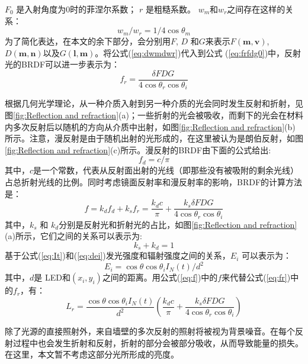   $F_{0}$ 是入射角度为0时的菲涅尔系数； $r$ 是粗糙系数。
$w_{m}$和$w_{r}$之间存在这样的关系：
\begin{equation}\label{eq:dwmdwr}
w_{m}/w_{r}=1/4\cos\theta_{m}
\end{equation}
为了简化表达，在本文的余下部分，会分别用$F$, $D$ 和$G$来表示$F(\mathbf{m},\mathbf{v})$, $D(\mathbf{m},\mathbf{n})$以及$G(\mathbf{l},\mathbf{m})$。将公式(\ref{eq:dwmdwr})代入到公式 (\ref{eq:frfdg0})中，反射光的BRDF可以进一步表示为：
\begin{equation}\label{eq:frfdg1}
  f_{r}=\frac{\delta FDG}{4\cos\theta_{r}\cos\theta_{i}}
\end{equation}

根据几何光学理论，从一种介质入射到另一种介质的光会同时发生反射和折射，见图\ref{fig:Reflection and refraction}(a)；一些折射的光会被吸收，而剩下的光会在材料内多次反射后以随机的方向从介质中出射，如图\ref{fig:Reflection and refraction}(b)所示。注意，漫反射是由于随机出射的光形成的，在这里被认为是朗伯反射，如图\ref{fig:Reflection and refraction}(c)所示。漫反射的BRDF由下面的公式给出:
\begin{equation}\label{eq:fd}
  f_{d}=c/\pi
\end{equation}
其中，$c$是一个常数，代表从反射面出射的光线（即那些没有被吸附的剩余光线）占总折射光线的比例。同时考虑镜面反射率和漫反射率的影响，BRDF的计算方法是：
\begin{equation}\label{eq:f}
  f=k_{d}f_{d}+k_{s}f_{r}=\frac{k_{d}c}{\pi}+\frac{k_{s}\delta FDG}{4\cos\theta_{r}\cos\theta_{i}}
\end{equation}
其中，$k_{s}$ 和 $k_{d}$分别是反射光和折射光的占比，如图\ref{fig:Reflection and refraction}(a)所示，它们之间的关系可以表示为:
\begin{equation}\label{eq:ks+kd=1}
  k_{s}+k_{d}=1
\end{equation}
基于公式(\ref{eq:It})和(\ref{eq:dei})发光强度和辐射强度之间的关系，$E_{i}$ 可以表示为：
\begin{equation}\label{eq:deicos}
  E_{i}=\cos\theta\cos\theta_{i}I_{N}(t)/d^{2}
\end{equation}
其中，$d$是 LED和$(x_{i},y_{i})$之间的距离。用公式(\ref{eq:f})中的$f$来代替公式(\ref{eq:fr})中的$f_{r}$，有：
\begin{equation}\label{eq:dLr-last}
  L_{r}=\frac{\cos\theta\cos\theta_{i}I_{N}(t)}{d^{2}}(\frac{k_{d}c}{\pi}+\frac{k_{s}\delta FDG}{4\cos\theta_{r}\cos\theta_{i}})
\end{equation}

除了光源的直接照射外，来自墙壁的多次反射的照射将被视为背景噪音。在每个反射过程中也会发生折射和反射，折射的部分会被部分吸收，从而导致能量的损失。在这里，本文暂不考虑这部分光所形成的亮度。

